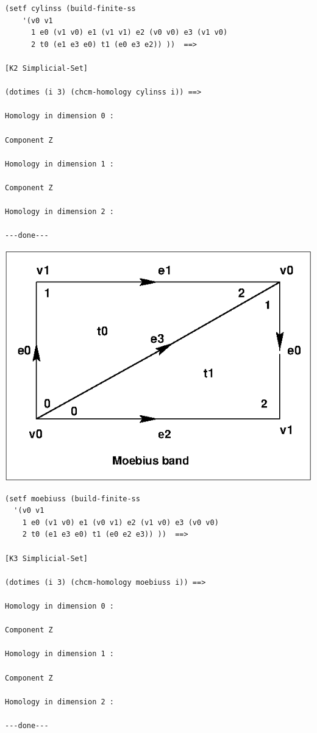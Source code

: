 {\footnotesize\begin{verbatim}
(setf cylinss (build-finite-ss 
    '(v0 v1 
      1 e0 (v1 v0) e1 (v1 v1) e2 (v0 v0) e3 (v1 v0)
      2 t0 (e1 e3 e0) t1 (e0 e3 e2)) ))  ==>

[K2 Simplicial-Set]

(dotimes (i 3) (chcm-homology cylinss i)) ==>

Homology in dimension 0 :

Component Z

Homology in dimension 1 :

Component Z

Homology in dimension 2 :

---done---
\end{verbatim}}
\newpage
%
\vskip 0.40cm
\centerline{\includegraphics{moebiuss.eps}}
\vskip 0.40cm
%
{\footnotesize\begin{verbatim}
(setf moebiuss (build-finite-ss 
  '(v0 v1 
    1 e0 (v1 v0) e1 (v0 v1) e2 (v1 v0) e3 (v0 v0)
    2 t0 (e1 e3 e0) t1 (e0 e2 e3)) ))  ==>

[K3 Simplicial-Set]

(dotimes (i 3) (chcm-homology moebiuss i)) ==>

Homology in dimension 0 :

Component Z

Homology in dimension 1 :

Component Z

Homology in dimension 2 :

---done---
\end{verbatim}}
\newpage
%
\vskip 0.40cm
